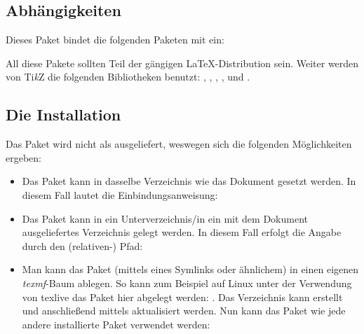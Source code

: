 \documentclass{sopra-base}
\begin{document}
\subsection{Abhängigkeiten}
    Dieses Paket bindet die folgenden Paketen mit ein:
    \begin{multicols}{3}
    \end{multicols}
    All diese Pakete sollten Teil der gängigen \LaTeX-Distribution sein. Weiter werden von Ti\textit{k}Z die folgenden
    Bibliotheken benutzt: , , , ,  und .

\subsection{Die Installation}
    Das Paket wird nicht als  ausgeliefert, weswegen sich die 
    folgenden Möglichkeiten ergeben:
    \begin{itemize}
        \item Das Paket kann in dasselbe Verzeichnis wie das Dokument
                gesetzt werden. In diesem Fall lautet die Einbindungsanweisung:
\begin{plainlatex}
\usepackage{sopra-models}
\end{plainlatex}
        \item Das Paket kann in ein Unterverzeichnis/in ein mit
                dem Dokument ausgeliefertes Verzeichnis gelegt werden. In
                diesem Fall erfolgt die Angabe durch den (relativen-) Pfad:
\begin{plainlatex}
\usepackage{./Mein/Pfad/zu/sopra-models}
\end{plainlatex}
        \item Man kann das Paket (mittels eines Symlinks oder ähnlichem)
              in einen eigenen \emph{texmf}-Baum ablegen.
              So kann zum Beispiel auf Linux unter der Verwendung von texlive
              das Paket hier abgelegt werden: .
              Das Verzeichnis kann erstellt und anschließend mittels
               aktualisiert werden. Nun kann
              das Paket wie jede andere installierte Paket verwendet werden:
\begin{plainlatex}
\usepackage{sopra-models}
\end{plainlatex}
    \end{itemize}
\end{document}
